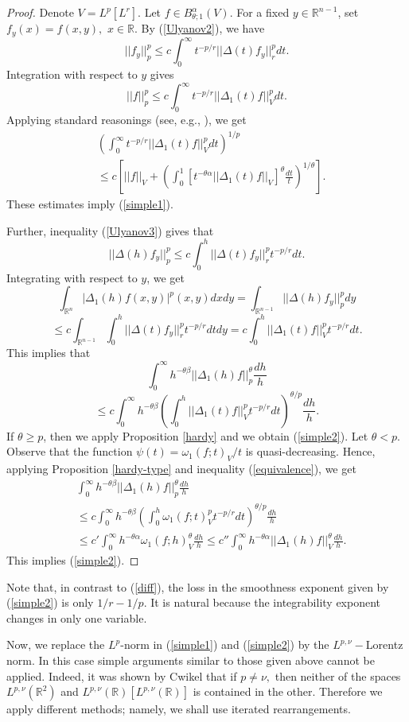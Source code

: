 \documentclass[12pt,twoside,reqno]{amsart}
\numberwithin{equation}{section}
\theoremstyle{definition}
\numberwithin{equation}{section}
\def\a{\alpha}
\def\b{\beta}
\def\o{\omega}
\def\R{\mathbb{R}}
\def\t{\theta}
\begin{document}
\begin{proof} Denote $V=L^p[L^r].$ Let  $f\in B^\a_{\t;1}(V)$.
For a fixed $y\in \R^{n-1}$, set $f_y(x)=f(x,y),\,\,x\in \R.$
By (\ref{Ulyanov2}), we have
$$
||f_y||_p^p\le c \int_0^\infty t^{-p/r}||\Delta(t)f_y||_r^pdt.
$$
Integration with respect to $y$ gives
$$
||f||_p^p\le c \int_0^\infty t^{-p/r}||\Delta_1(t)f||_V^pdt.
$$
Applying standard reasonings (see, e.g., \cite[Ch. 5.4]{BS}), we get
$$
\begin{aligned}
&\left(\int_0^\infty t^{-p/r}||\Delta_1(t)f||_{V}^pdt\right)^{1/p}\\
&\le c \left[||f||_{V}+\left(\int_0^1[t^{-\t\a}||\Delta_1(t)f||_{V}]^\t \frac{dt}{t}\right)^{1/\t}\right].
\end{aligned}
$$
These estimates imply (\ref{simple1}).




Further, inequality (\ref{Ulyanov3}) gives that
$$
||\Delta (h)f_y||_p^p\le c\int_0^h ||\Delta (t)f_y||_r^p t^{-p/r}dt.
$$
Integrating with respect to $y$, we get
$$
\int_{\R^{n}}|\Delta_1 (h)f(x,y)|^p(x,y)dxdy= \int_{\R^{n-1}}||\Delta (h)f_y||_p^pdy
$$
$$
\le c \int_{\R^{n-1}}\int_0^h ||\Delta (t)f_y||_r^p t^{-p/r}dtdy=c\int_0^h ||\Delta_1(t)f||^p_{V}t^{-p/r}dt.
$$
This implies that
$$
\int_0^\infty h^{-\t\b}||\Delta_1 (h)f||_p^\t
 \frac{dh}{h}
 $$
 $$
 \le c \int_0^\infty h^{-\t\b}\left(\int_0^h ||\Delta_1(t)f||^p_{V}t^{-p/r}dt\right)^{\t/p}
 \frac{dh}{h}.
 $$
 If $\t\ge p$, then we apply Proposition \ref{hardy} and we obtain (\ref{simple2}).
 Let $\t<p$. Observe that the function
 $\psi(t)=\o_1(f;t)_V/t$
is quasi-decreasing. Hence, applying
  Proposition  \ref{hardy-type} and inequality (\ref{equivalence}), we get
$$
\begin{aligned}
 &\int_0^\infty h^{-\t\b}||\Delta_1 (h)f||_p^\t
 \frac{dh}{h}\\
&\le c \int_0^\infty h^{-\t\b}\left(\int_0^h \o_1(f;t)^p_{V}t^{-p/r}dt\right)^{\t/p}
 \frac{dh}{h}\\
&\le c'\int_0^\infty h^{-\t\a}\o_1(f;h)^\t_{V}\frac{dh}{h}\le c''\int_0^\infty h^{-\t\a}||\Delta_1(h)f||^\t_{V}\frac{dh}{h}.
\end{aligned}
$$
This implies (\ref{simple2}).
 \end{proof}

Note that,  in contrast to (\ref{diff}), the loss in the smoothness exponent given by (\ref{simple2}) is only $1/r-1/p.$ It is natural because the integrability exponent changes in only one variable.


Now, we replace the $L^p$-norm  in (\ref{simple1}) and (\ref{simple2}) by the $L^{p,\nu}-$Lorentz norm.  In this case simple arguments similar
to those given above cannot be applied. Indeed, it was shown by Cwikel \cite{Cwikel} that if $p\not = \nu,$ then neither  of the spaces
$L^{p,\nu}(\R^2)$ and $L^{p,\nu}(\R)[L^{p,\nu}(\R)]$ is contained in the other. Therefore we apply different methods; namely, we shall use iterated rearrangements.
\end{document}
